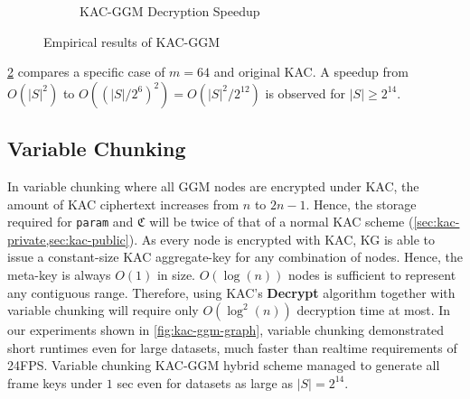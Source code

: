 \documentclass[hyp,a4paper,12pt,openbib]{socreport}
\begin{document}
\begin{figure}[H]
\begin{subfigure}[t]{0.5\textwidth}
\caption{KAC-GGM Decryption Speedup}
\label{fig:kac-ggm-speedup}
\end{subfigure}
\caption{Empirical results of KAC-GGM}

\end{figure}

\cref{fig:kac-ggm-speedup} compares a specific case of $m=64$ and original KAC. A speedup from $O(|S|^2)$ to $O((|S|/2^6)^2) = O(|S|^2/2^{12})$ is observed for $|S| \geq 2^{14}$.





\subsection{Variable Chunking}

In variable chunking where all GGM nodes are encrypted under KAC, the amount of KAC ciphertext increases from $n$ to $2n-1$. Hence, the storage required for \texttt{param} and $\mathfrak{C}$ will be twice of that of a normal KAC scheme (\cref{sec:kac-private,sec:kac-public}). As every node is encrypted with KAC, KG is able to issue a constant-size KAC aggregate-key for any combination of nodes. Hence, the meta-key is always $O(1)$ in size. $O(\log(n))$ nodes is sufficient to represent any contiguous range. Therefore, using KAC's \textbf{Decrypt} algorithm together with variable chunking will require only $O(\log^2(n))$ decryption time at most. In our experiments shown in \cref{fig:kac-ggm-graph}, variable chunking demonstrated short runtimes even for large datasets, much faster than realtime requirements of 24FPS. Variable chunking KAC-GGM hybrid scheme managed to generate all frame keys under $1$ sec even for datasets as large as $|S|=2^{14}$.
\end{document}
